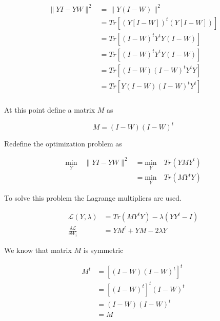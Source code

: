 \documentclass[12pt,journal]{IEEEtran}
\begin{document}
    \begin{equation*}
        \begin{aligned}
            \lVert Y I - Y W \rVert^2 &= \lVert Y (I - W) \rVert^2\\
            &= Tr[(Y [I-W])^t (Y [I-W])]\\
            &= Tr[(I-W)^t Y^t Y (I-W)]\\
            &= Tr[(I-W)^t Y^t Y (I-W)]\\
            &= Tr[(I-W) (I-W)^t Y^t Y]\\
            &= Tr[Y (I-W) (I-W)^t Y^t]\\
        \end{aligned}
    \end{equation*}

    At this point define a matrix $M$ as

    \begin{equation*}
        M = (I-W) (I-W)^t
    \end{equation*}

    Redefine the optimization problem as

    \begin{equation*}
        \begin{aligned}
            \underset{Y}{\text{min}} \quad \lVert YI - Y W \rVert^2
            &= 
            \underset{Y}{\text{min}} \quad Tr(Y M Y^t)\\
            &=
            \underset{Y}{\text{min}} \quad Tr(M Y^t Y)
        \end{aligned}
    \end{equation*}

    To solve this problem the Lagrange multipliers are used.

    \begin{equation*}
        \begin{aligned}
            \mathcal{L}(Y, \lambda) &= Tr( M Y^t Y) - \lambda (Y Y^t - I)\\
            \frac{\delta \mathcal{L}}{\delta W_i} &= Y M^t + Y M - 2 \lambda Y
        \end{aligned}
    \end{equation*}

    We know that matrix $M$ is symmetric 

    \begin{equation*}
        \begin{aligned}
            M^t &= [(I-W) (I-W)^t]^t\\
                &= [(I-W)^t]^t (I-W)^t\\
                &= (I-W) (I-W)^t\\
                &= M
        \end{aligned}
    \end{equation*}
\end{document}
